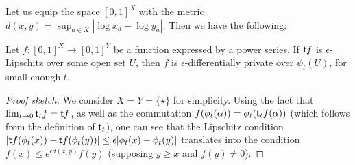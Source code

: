 Let us equip the space $[0,1]^{X}$ with the metric $d(x,y)=\sup_{a\in X}|\log x_{a}-\log y_{a}|$. Then we have the following:
\begin{proposition}
Let $f: [0,1]^{X}\to [0,1]^{Y}$ be a function expressed by a power series. If $\mathsf{t} f$ is $\epsilon$-Lipschitz over some open set $U$, then $f$ is $\epsilon$-differentially private over $\psi_{t}(U)$, for small enough $t$.
\end{proposition}
\begin{proof}[Proof sketch]
We consider $X=Y=\{\star\}$ for simplicity.
Using the fact that $\lim_{t\to 0}\mathsf{t} _{t}f= \mathsf{t} f$, as well as the commutation $f(\phi_{t}(\alpha)) = \phi_{t}(\mathsf{t} _{t}f(\alpha))$ (which follows from the definition of $\mathsf{t} _{t}$), one can see that the Lipschitz condition  
$|\mathsf{t} f(\phi_{t}(x))-\mathsf{t} f(\phi_{t}(y))|\leq \epsilon |\phi_{t}(x)-\phi_{t}(y)|$ translates into the condition 
$f(x) \leq e^{\epsilon d(x,y)} f(y)$ (supposing $y\geq x$ and $f(y)\neq 0$).
\end{proof}

%
%
%
%
%
%
%
%



